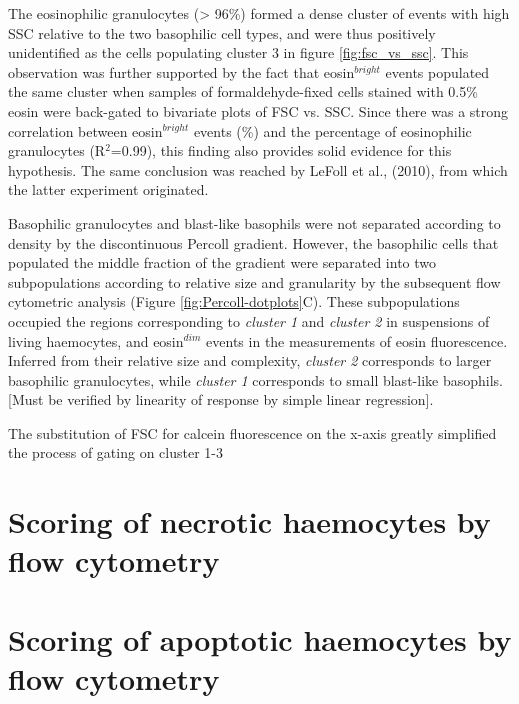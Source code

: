 The eosinophilic granulocytes (> 96\%) formed a dense cluster of events with high SSC relative to the two basophilic cell types, and were thus positively unidentified as the cells populating cluster 3 in figure \ref{fig:fsc_vs_ssc}. This observation was further supported by the fact that eosin$^{bright}$ events populated the same cluster when samples of formaldehyde-fixed cells stained with 0.5\% eosin were back-gated to bivariate plots of FSC vs. SSC. Since there was a strong correlation between eosin$^{bright}$ events (\%) and the percentage of eosinophilic granulocytes (R$^{2}$=0.99), this finding also provides solid evidence for this hypothesis. The same conclusion was reached by LeFoll et al., (2010), from which the latter experiment originated.

Basophilic granulocytes and blast-like basophils were not separated according to density by the discontinuous Percoll gradient. However, the basophilic cells that populated the middle fraction of the gradient were separated into two subpopulations according to relative size and granularity by the subsequent flow cytometric analysis (Figure \ref{fig:Percoll-dotplots}C). These subpopulations occupied the regions corresponding to \emph{cluster 1} and \emph{cluster 2} in suspensions of living haemocytes, and eosin$^{dim}$ events in the measurements of eosin fluorescence. Inferred from their relative size and complexity, \emph{cluster 2} corresponds to larger basophilic granulocytes, while \emph{cluster 1} corresponds to small blast-like basophils. [Must be verified by linearity of response by simple linear regression].

The substitution of FSC for calcein fluorescence on the x-axis greatly simplified the process of gating on cluster 1-3 


\section{Scoring of necrotic haemocytes by flow cytometry}






\section{Scoring of apoptotic haemocytes by flow cytometry}
